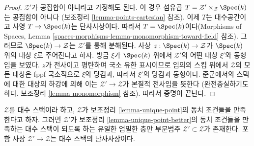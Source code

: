 \begin{proof}
$\mathcal{Z}'$가 공집합이 아니라고 가정해도 된다. 이 경우 섬유곱
$T = \mathcal{Z}' \times_\mathcal{Z} \Spec(k)$는 공집합이 아니다
(보조정리 \ref{lemma-points-cartesian} 참조).
이제 $T$는 대수공간이고 사영 $T \to \Spec(k)$는 단사사상이다.
따라서 $T = \Spec(k)$이다(Morphisms of Spaces, Lemma
\ref{spaces-morphisms-lemma-monomorphism-toward-field} 참조).
그러므로 $\Spec(k) \to \mathcal{Z}$는 $\mathcal{Z}'$를 통해 분해된다.
사상 $z : \Spec(k) \to \mathcal{Z}$가 $\Spec(k)$ 위의 대상 $\xi$로
주어진다고 하자. 방금 $\xi$가 $\Spec(k)$ 위에서 $\mathcal{Z}'$의
어떤 대상 $\xi'$와 동형임을 보였다. $z$가 전사이고 평탄하며
국소 유한 표시이므로 임의의 스킴 위에서 $\mathcal{Z}$의 모든 대상은
fppf 국소적으로 $\xi$의 당김과, 따라서 $\xi'$의 당김과 동형이다.
준군에서의 스택에 대한 대상의 하강에 의해 이는
$\mathcal{Z}' \to \mathcal{Z}$가 본질적 전사임을 뜻한다
(완전충실하기도 하다. 보조정리 \ref{lemma-monomorphism} 참조).
따라서 증명이 끝난다.
\end{proof}

\begin{lemma}
\label{lemma-improve-unique-point}
$\mathcal{Z}$를 대수 스택이라 하고, $\mathcal{Z}$가 보조정리
\ref{lemma-unique-point}의 동치 조건들을 만족한다고 하자.
그러면 $\mathcal{Z}'$가 보조정리 \ref{lemma-unique-point-better}의
동치 조건들을 만족하는 대수 스택이 되도록 하는 유일한 엄밀한 충만 부분범주
$\mathcal{Z}' \subset \mathcal{Z}$가 존재한다. 포함 사상
$\mathcal{Z}' \to \mathcal{Z}$는 대수 스택의 단사사상이다.
\end{lemma}

